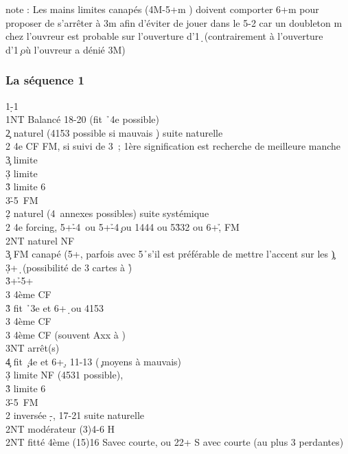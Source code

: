 \documentclass[a4paper]{article}
\begin{document}
note :	Les mains limites canapés (4M-5+m ) doivent comporter 6+m pour proposer de s'arrêter à 3m
afin d'éviter de jouer dans le 5-2 car un doubleton m chez l'ouvreur est probable sur l'ouverture d'1\d\ 
(contrairement à l'ouverture d'1\c\ où l'ouvreur a dénié 3M)

\subsubsection{La séquence 1\pdfs}

\begin{bidtable}
1\d-1\s\\
1NT \> Balancé 18-20 (fit \h\ 4e possible)\\
2\c \> naturel (4153 possible si mauvais \d ) suite naturelle\+\\
2\s \> 4e CF FM, si suivi de 3\s\ ; 1ère signification est recherche de meilleure manche\\
3\c \> limite\\
3\d \> limite\\
3\h \> limite 6\h \\
3\s {}\h -5\s\ FM\-\\
2\d \> naturel (4\s\ annexes possibles) suite systémique\+\\
2\s \> 4e forcing, 5+\h -4\s\ ou 5+\h -4\c\ ou 1444 ou 5\h 332 ou 6+\h , FM\\
2NT \> naturel NF\\
3\c \> FM canapé (5+\s , parfois avec 5\h\ s'il est préférable de mettre l'accent sur les \c )\+\\
3\d \> 6+\d\ (possibilité de 3 cartes à \h )\+\\
3\h {}+\h -5+\c \\
3\s \> 4ème CF\-\\
3\h \> fit \h\ 3e et 6+\d\ ou 4153\+\\
3\s \> 4ème CF\-\\
3\s \> 4ème CF (souvent Axx à \s )\\
3NT \> arrêt(s) \s \\
4\c \> fit \c\ 4e et 6+\d , 11-13 (\c\ moyens à mauvais)\-\\
3\d \> limite NF (4531 possible),\\
3\h \> limite 6\h \\
3\s {}\h -5\s\ FM\-\\
2\s \> inversée \d -\s , 17-21 suite naturelle\+\\
2NT \> modérateur (3)4-6 H\-\\
2NT \> fitté 4ème (15)16 Savec courte, ou 22+ S avec courte (au plus 3 perdantes)\\

\end{bidtable}
\end{document}
